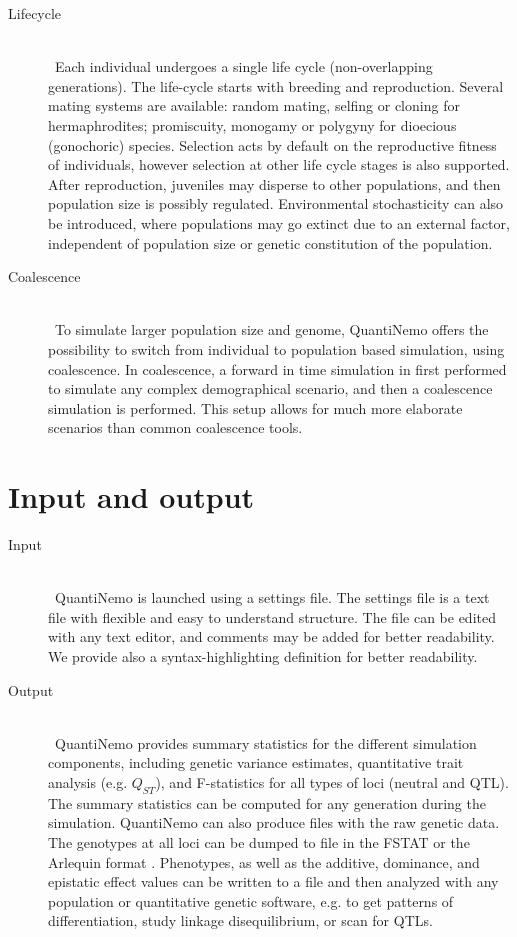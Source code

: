 \documentclass[letterpaper,12pt,oneside]{book}
\begin{document}
\begin{description}
\item[Lifecycle]\hspace*{\fill}\\\
Each individual undergoes a single life cycle (non-overlapping generations). The life-cycle starts with breeding and reproduction. Several mating systems are available: random mating, selfing or cloning for hermaphrodites; promiscuity, monogamy or polygyny for dioecious (gonochoric) species. Selection acts by default on the reproductive fitness of individuals, however selection at other life cycle stages is also supported. After reproduction, juveniles may disperse to other populations, and then population size is possibly regulated. Environmental stochasticity can also be introduced, where populations may go extinct due to an external factor, independent of population size or genetic constitution of the population.

\item[Coalescence]\hspace*{\fill}\\\
To simulate larger population size and genome, QuantiNemo offers the possibility to switch from individual to population based simulation, using coalescence. In coalescence, a forward in time simulation in first performed to simulate any complex demographical scenario, and then a coalescence simulation is performed. This setup allows for much more elaborate scenarios than common coalescence tools. 
\end{description}


\section{Input and output}
\begin{description}
\item[Input]\hspace*{\fill}\\\
QuantiNemo is launched using a settings file. The settings file is a text file with flexible and easy to understand structure. The file can be edited with any text editor, and comments may be added for better readability. We provide also a syntax-highlighting definition for better readability.  

\item[Output]\hspace*{\fill}\\\
QuantiNemo provides summary statistics for the different simulation components, including genetic variance estimates, quantitative trait analysis (e.g. $Q_{ST}$), and F-statistics for all types of loci (neutral and QTL). The summary statistics can be computed for any generation during the simulation. QuantiNemo can also produce files with the raw genetic data. The genotypes at all loci can be dumped to file in the FSTAT \citep{Goudet_1995} or the Arlequin format \citep{Excoffier_2010}. Phenotypes, as well as the additive, dominance, and epistatic effect values can be written to a file and then analyzed with any population or quantitative genetic software, e.g.  to get patterns of differentiation, study linkage disequilibrium, or scan for QTLs.
\end{description}
\end{document}
